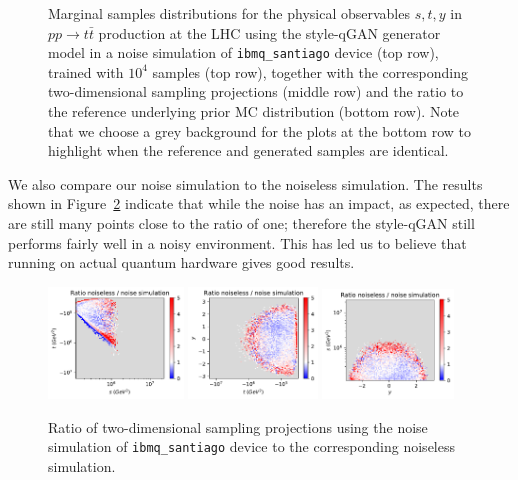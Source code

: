 \documentclass[twocolumn,preprintnumbers,superscriptaddress]{revtex4-2}
\begin{document}
\begin{figure}
  \caption{\label{fig:ibmnoise}
    Marginal samples distributions for the physical observables $s,t,y$
    in $pp\rightarrow t\bar{t}$ production at the LHC using the style-qGAN generator model in
    a noise simulation of {\tt ibmq\_santiago} device (top row), trained with $10^4$ samples (top row),
    together with the corresponding two-dimensional sampling projections (middle row) and the ratio to the reference underlying
    prior MC distribution (bottom row). Note that we choose a grey background for the plots at the bottom
    row to highlight when the reference and generated samples are identical.}
\end{figure}

We also compare our noise simulation to the noiseless simulation.
The results shown in Figure~\ref{fig:ibmnoise2} indicate that while the noise has an impact, as expected, there are
still many points close to the ratio of one; therefore the style-qGAN still performs fairly well in a noisy environment. This has led us
to believe that running on actual quantum hardware gives good results.

\begin{figure}

  \includegraphics[width=0.32\textwidth]{plots/hardware_noise_simulation/s-t_RATIO_100k_noiseless-noise.pdf}%
  \includegraphics[width=0.305\textwidth]{plots/hardware_noise_simulation/t-y_RATIO_100k_noiseless-noise.pdf}%
  \includegraphics[width=0.31\textwidth]{plots/hardware_noise_simulation/y-s_RATIO_100k_noiseless-noise.pdf}

  \caption{\label{fig:ibmnoise2}Ratio of two-dimensional sampling projections using the noise simulation of {\tt ibmq\_santiago} device to the
    corresponding noiseless simulation.}
\end{figure}
\end{document}

